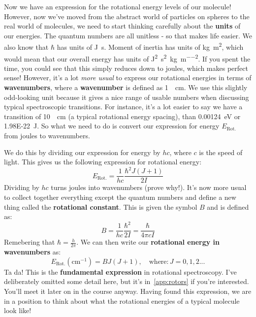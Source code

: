 \documentclass{memoir}[11pt,oneside,a4paper,openany]
\begin{document}
Now we have an expression for the rotational energy levels of our molecule! However, now we've moved from the abstract world of particles on spheres to the real world of molecules, we need to start thinking carefully about the \textbf{units} of our energies. 
The quantum numbers are all unitless - so that makes life easier. We also know that $\hbar$ has units of \si{\joule\second}. Moment of inertia has units of \si{\kilo\gram\metre\squared}, which would mean that our overall energy has units of \si{\joule\squared\second\squared\per\kilo\gram\per\metre\squared}. If you spent the time, you could see that this simply reduces down to joules, which makes perfect sense! However, it's a lot \emph{more usual} to express our rotational energies in terms of \textbf{wavenumbers}, where a \textbf{wavenumber} is defined as \SI{1}{\per\centi\metre}. We use this slightly odd-looking unit because it gives a nice range of usable numbers when discussing typical spectroscopic transitions. For instance, it's a lot easier to say we have a transition of \SI{10}{\per\centi\metre} (a typical rotational energy spacing), than \SI{0.00124}{\electronvolt} or \SI{1.98E-22}{\joule}. So what we need to do is convert our expression for energy $E_{\text{Rot.}}$ from joules to wavenumbers.

We do this by dividing our expression for energy by $hc$, where $c$ is the speed of light. This gives us the following expression for rotational energy:
\begin{equation}
	E_{\text{Rot.}} = \frac{1}{hc}\frac{\hbar^2J(J+1)}{2I}
\end{equation}
Dividing by $hc$ turns joules into wavenumbers (prove why!). It's now more usual to collect together everything except the quantum numbers and define a new thing called the \textbf{rotational constant}. This is given the symbol $B$ and is defined as:
\begin{equation}
	B = \frac{1}{hc}\frac{\hbar^2}{2I} = \frac{\hbar}{4\pi cI}
\end{equation}
Remebering that $\hbar = \frac{h}{2\pi}$. We can then write our \textbf{rotational energy in wavenumbers} as:
\begin{equation}
	E_{\text{Rot.}}(\text{cm}^{-1}) = BJ(J+1),\quad \text{where:}\, J = 0,1,2...
\end{equation}
Ta da! This is the \textbf{fundamental expression} in rotational spectroscopy. I've deliberately omitted some detail here, but it's in~\autoref{app:rotors} if you're interested. You'll meet it later on in the course anyway. Having found this expression, we are in a position to think about what the rotational energies of a typical molecule look like! 
\end{document}
